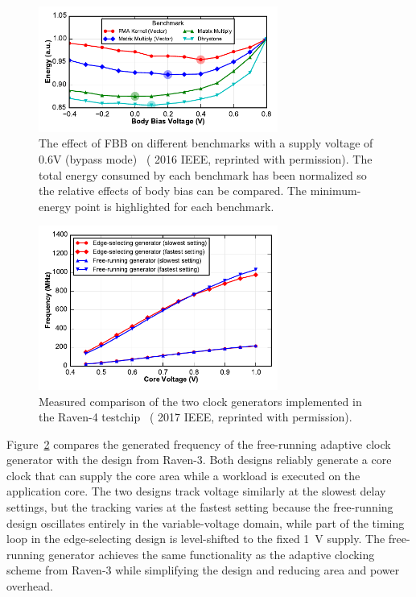 \documentclass[graybox]{svmult}
\begin{document}
\begin{figure}
  \centering
  \includegraphics[width=0.7\textwidth]{6-raven4-fbb}
  \caption{The effect of FBB on different benchmarks with a supply voltage of 0.6V (bypass mode)~\cite{Keller2016} ({\textcopyright} 2016 IEEE, reprinted with permission).  The total energy consumed by each benchmark has been normalized so the relative effects of body bias can be compared.  The minimum-energy point is highlighted for each benchmark.}
  \label{fig:6-raven4-fbb}
\end{figure}

\begin{figure}
  \centering
  \includegraphics[width=0.7\textwidth]{6-raven4-clockgen}
  \caption{Measured comparison of the two clock generators implemented in the Raven-4 testchip~\cite{Keller2017} ({\textcopyright} 2017 IEEE, reprinted with permission).}
  \label{fig:6-raven4-clockgen}
\end{figure}

Figure~\ref{fig:6-raven4-clockgen} compares the generated frequency of the free-running adaptive clock generator with the design from Raven-3.
Both designs reliably generate a core clock that can supply the core area while a workload is executed on the application core.
The two designs track voltage similarly at the slowest delay settings, but the tracking varies at the fastest setting because the free-running design oscillates entirely in the variable-voltage domain, while part of the timing loop in the edge-selecting design is level-shifted to the fixed \SI{1}{\volt} supply.
The free-running generator achieves the same functionality as the adaptive clocking scheme from Raven-3 while simplifying the design and reducing area and power overhead.
\end{document}
